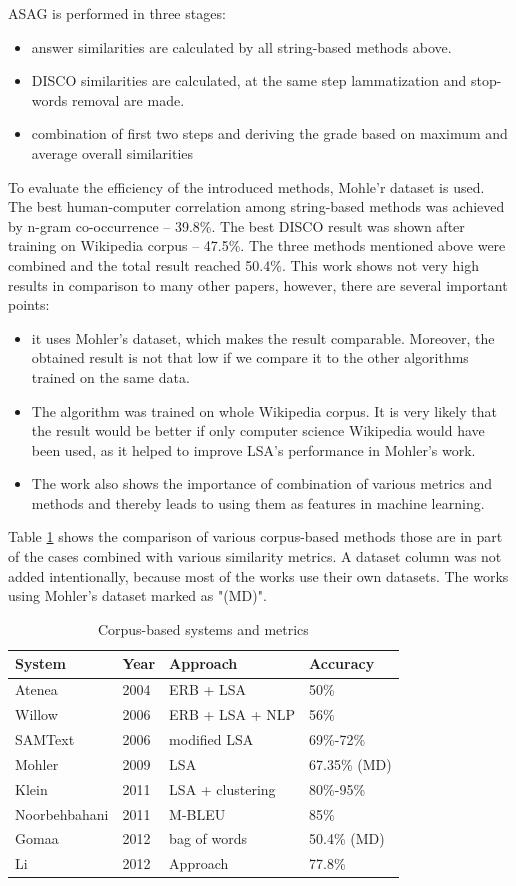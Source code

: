 \documentclass[11pt]{report}
\numberwithin{equation}{section} %
\begin{document}
ASAG is performed in three stages:
\begin{itemize}
\item answer similarities are calculated by all string-based methods above.
\item DISCO similarities are calculated, at the same step lammatization and stop-words removal are made.
\item combination of first two steps and deriving the grade based on maximum and average overall similarities
\end{itemize}
To evaluate the efficiency of the introduced methods, Mohle'r dataset is used. The best human-computer correlation among string-based methods was achieved by n-gram co-occurrence -- 39.8\%. The best DISCO result was shown after training on Wikipedia corpus -- 47.5\%. The three methods mentioned above were combined and the total result reached 50.4\%. This work shows not very high results in comparison to many other papers, however, there are several important points:
\begin{itemize}
\item it uses Mohler's dataset, which  makes the result comparable. Moreover, the obtained result is not that low if we compare it to the other algorithms trained on the same data.
\item The algorithm was trained on whole Wikipedia corpus. It is very likely that the result would be better if only computer science Wikipedia would have been used, as it helped to improve LSA's performance in Mohler's work.
\item The work also shows the importance of combination of various metrics and methods and thereby leads to using them as features in machine learning.
\end{itemize}
 
Table \ref{Corpus} shows the comparison of various corpus-based methods those are in part of the cases combined with various similarity metrics. A dataset column was not added intentionally, because most of the works use their own datasets. The works using Mohler's dataset marked as "(MD)".
 
\begin{table}[h!]
\centering
\caption{Corpus-based systems and metrics}
\label{Corpus}
\begin{tabular}{|l|l|l|l|}
\hline
 System & Year & Approach & Accuracy \\ \hline
 Atenea & 2004 & ERB + LSA & 50\% \\ \hline
 Willow & 2006 & ERB + LSA + NLP & 56\% \\ \hline
 SAMText & 2006 & modified LSA & 69\%-72\% \\ \hline
 Mohler & 2009 & LSA & 67.35\% (MD) \\ \hline
 Klein & 2011 & LSA + clustering &  80\%-95\% \\ \hline
 Noorbehbahani & 2011 & M-BLEU & 85\% \\ \hline
 Gomaa & 2012 & bag of words & 50.4\% (MD) \\ \hline
 Li & 2012 & Approach & 77.8\% \\ \hline
\end{tabular}
\end{table}
 
\end{document}
